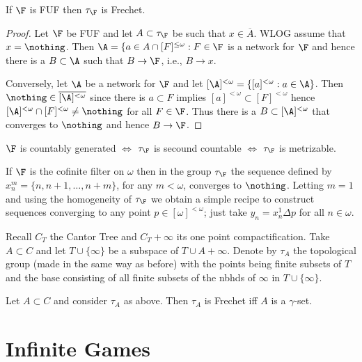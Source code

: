 \documentclass{article}
\begin{document}
\begin{prop}
    If \(\F\) is FUF then \(\tau_{\F}\) is Frechet.
\end{prop}
\begin{proof}
    Let \(\F\) be FUF and let \(A \subset \tau_{\F}\) be such that \(x \in \overline{A}\). WLOG assume that \(x = \nothing\). Then \(\A = \{a \in A \cap [F]^{\leq\omega}: F \in \F\) is a network for \(\F\) and hence there is a \(B \subset \A\) such that \(B \to \F\), i.e., \(B \to x\).

    Conversely, let \(\A\) be a network for \(\F\) and let \([\A]^{<\omega} = \{[a]^{<\omega}:a \in \A\}\). Then \(\nothing \in \overline{[\A]^{<\omega}}\) since there is \(a \subset F\) implies \([a]^{<\omega} \subset [F]^{<\omega}\) hence \([\A]^{<\omega}\cap [F]^{<\omega}\neq \nothing\) for all \(F \in \F\). Thus there is a \(B \subset [\A]^{<\omega} \) that converges to \(\nothing\) and hence \(B \to \F\).
\end{proof}
\begin{prop}
    \(\F\) is countably generated \(\iff\) \(\tau_{\F}\) is secound countable \(\iff\) \(\tau_{\F}\) is metrizable.
\end{prop}

\begin{exam}
    If \(\F\) is the cofinite filter on \(\omega\) then in the group \(\tau_{\F}\) the sequence defined by \(x_n^m = \{n, n + 1, \dots, n + m\}\), for any \(m < \omega\),  converges to \(\nothing\). Letting \(m = 1\) and using the homogeneity of \(\tau_{\F}\) we obtain a simple recipe to construct sequences converging to any point \(p \in [\omega]^{<\omega}\); just take \(y_n = x_n^1 \Delta p\) for all \(n \in \omega\).
\end{exam}
\begin{exam}
    Recall \(C_T\) the Cantor Tree and \(C_T + \infty\) its one point compactification. Take \(A \subset C\) and let \(T \cup \{\infty\}\) be a subspace of \(T \cup A + \infty\). Denote by \(\tau_A\) the topological group (made in the same way as before) with the points being finite subsets of \(T\) and the base consisting of all finite subsets of the nbhds of \(\infty\) in \(T \cup \{\infty\}\).
\end{exam}
\begin{prop}
    Let \(A \subset C\) and consider \(\tau_A\) as above. Then \(\tau_A\) is Frechet iff \(A\) is a \(\gamma\)-set.
\end{prop}
\section{Infinite Games}
\end{document}
